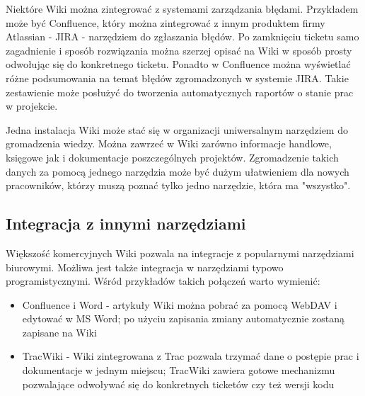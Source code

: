 \documentclass{article}
\begin{document}
	Niektóre Wiki można zintegrować z systemami zarządzania błędami. Przykładem może być Confluence, który można zintegrować z innym produktem firmy Atlassian - JIRA - narzędziem do zgłaszania błędów. Po zamknięciu ticketu samo zagadnienie i sposób rozwiązania można szerzej opisać na Wiki w sposób prosty odwołując się do konkretnego ticketu. Ponadto w Confluence można wyświetlać różne podsumowania na temat błędów zgromadzonych w systemie JIRA. Takie zestawienie może posłużyć do tworzenia automatycznych raportów o stanie prac w projekcie.

	Jedna instalacja Wiki może stać się w organizacji uniwersalnym narzędziem do gromadzenia wiedzy. Można zawrzeć w Wiki zarówno informacje handlowe, księgowe jak i dokumentacje poszczególnych projektów. Zgromadzenie takich danych za pomocą jednego narzędzia może być dużym ułatwieniem dla nowych pracowników, którzy muszą poznać tylko jedno narzędzie, która ma "wszystko". 



	\subsection{Integracja z innymi narzędziami}

	Większość komercyjnych Wiki pozwala na integracje z popularnymi narzędziami biurowymi. Możliwa jest także integracja w narzędziami typowo programistycznymi. Wśród przykładów takich połączeń warto wymienić:

\begin{itemize}
\item Confluence i Word - artykuły Wiki można pobrać za pomocą WebDAV i  edytować w MS Word; po użyciu zapisania zmiany automatycznie zostaną zapisane na Wiki
\item TracWiki - Wiki zintegrowana z Trac pozwala trzymać dane o postępie prac i dokumentacje w jednym miejscu; TracWiki zawiera gotowe mechanizmu pozwalające odwoływać się do konkretnych ticketów czy też wersji kodu 

\end{itemize} 
\end{document}

